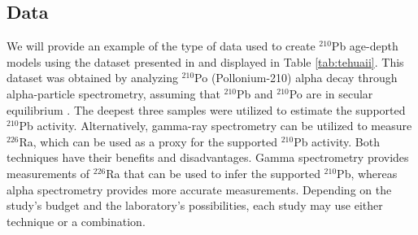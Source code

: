 \documentclass [10pt] {article}
\newcommand{\ac}{\color{red} }  %
\newcommand{\ca}{\color{black}} %
\begin{document}
\subsection{Data}

We will provide an example of the type of data used to create $^{210}$Pb age-depth models using the dataset presented in \citet{Sanchez-Cabeza2012} and displayed in Table \ref{tab:tehuaii}. This dataset was obtained by analyzing $^{210}$Po (Pollonium-210) alpha decay  through alpha-particle spectrometry, assuming that $^{210}$Pb and $^{210}$Po are in secular equilibrium \citep[see][for details]{Sanchez-Cabeza2012}. The deepest three samples were utilized to estimate the supported $^{210}$Pb activity. Alternatively, gamma-ray spectrometry can be utilized to measure $^{226}$Ra, which can be used as a proxy for the supported $^{210}$Pb activity. Both techniques have their benefits and disadvantages. Gamma spectrometry provides measurements of $^{226}$Ra that can be used to infer the supported $^{210}$Pb, whereas alpha spectrometry provides more accurate measurements. Depending on the study's budget and the laboratory's possibilities, each study may use either technique or a combination.

\end{document}
